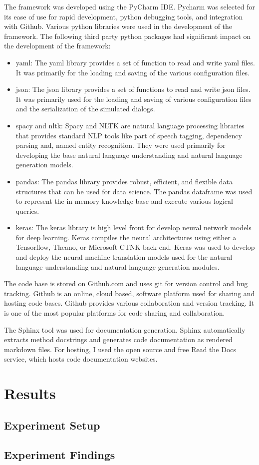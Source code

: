 The framework was developed using the PyCharm IDE. Pycharm was selected for its ease of use for rapid development, python debugging tools, and integration with Github. Various python libraries were used in the development of the framework. The following third party python packages had significant impact on the development of the framework:
\begin{itemize}
	\item yaml: The yaml library provides a set of function to read and write yaml files. It was primarily for the loading and saving of the various configuration files. 
	\item json: The json library provides a set of functions to read and write json files. It was primarily used for the loading and saving of various configuration files and the serialization of the simulated dialogs. 
	\item spacy and nltk: Spacy and NLTK are natural language processing libraries that provides standard NLP tools like part of speech tagging, dependency parsing and, named entity recognition. They were used primarily for developing the base natural language understanding and natural language generation models. 
	\item pandas: The pandas library provides robust, efficient, and flexible data structures that can be used for data science. The pandas dataframe was used to represent the in memory knowledge base and execute various logical queries.
	\item keras: The keras library is high level front for develop neural network models for deep learning. Keras compiles the neural architectures using either a Tensorflow, Theano, or Microsoft CTNK back-end. Keras was used to develop and deploy the neural machine translation models used for the natural language understanding and natural language generation modules.
\end{itemize}

The code base is stored on Github.com and uses git for version control and bug tracking. Github is an online, cloud based, software platform used for sharing and hosting code bases. Github provides various collaboration and version tracking. It is one of the most popular platforms for code sharing and collaboration. 

The Sphinx tool was used for documentation generation. Sphinx automatically extracts method docstrings and generates code documentation as rendered markdown files. For hosting, I used the open source and free Read the Docs service, which hosts code documentation websites.  

\chapter{Results}
\section{Experiment Setup}
\section{Experiment Findings}




